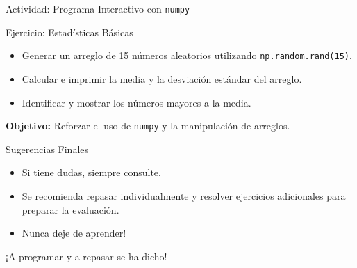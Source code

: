 \documentclass[10pt]{beamer}
\begin{document}
\begin{frame}[fragile]{Actividad: Programa Interactivo con \texttt{numpy}}
  \begin{block}{Ejercicio: Estadísticas Básicas}
    \begin{itemize}
      \item Generar un arreglo de 15 números aleatorios utilizando \texttt{np.random.rand(15)}.
      \item Calcular e imprimir la media y la desviación estándar del arreglo.
      \item Identificar y mostrar los números mayores a la media.
    \end{itemize}
  \end{block}
  \vspace{0.2cm}
  \textbf{Objetivo:} Reforzar el uso de \texttt{numpy} y la manipulación de arreglos.
\end{frame}


\begin{frame}{Sugerencias Finales}
  \begin{itemize}
    \item Si tiene dudas, siempre consulte.
    \item Se recomienda repasar individualmente y resolver ejercicios adicionales para preparar la evaluación.
    \item Nunca deje de aprender!
  \end{itemize}
  \vspace{0.2cm}
  \centerline{\Large ¡A programar y a repasar se ha dicho!}
\end{frame}
\end{document}
